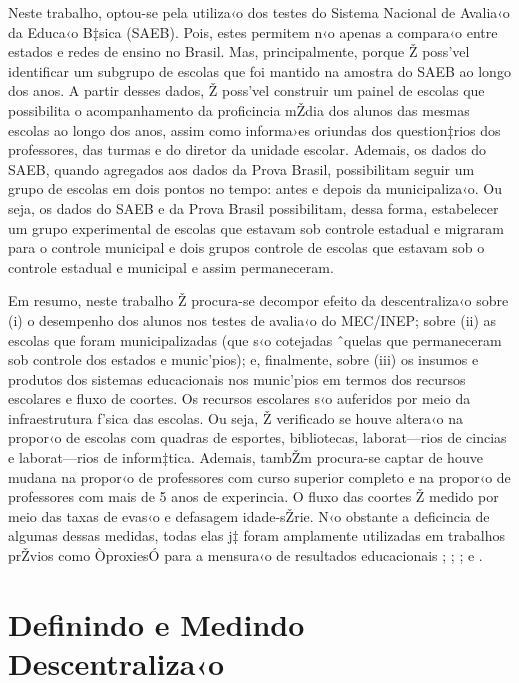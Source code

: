 \documentclass[a4paper, 12pt]{article}
\begin{document}
Neste trabalho, optou-se pela utiliza‹o dos testes do Sistema Nacional de Avalia‹o da Educa‹o B‡sica (SAEB). Pois, estes permitem n‹o apenas a compara‹o entre estados e redes de ensino no Brasil. Mas, principalmente, porque Ž poss’vel identificar um subgrupo de escolas que foi mantido na amostra do SAEB ao longo dos anos. A partir desses dados, Ž poss’vel construir um painel de escolas que possibilita o acompanhamento da proficincia mŽdia dos alunos das mesmas escolas ao longo dos anos, assim como informa›es oriundas dos question‡rios dos professores, das turmas e do diretor da unidade escolar. Ademais, os dados do SAEB, quando agregados aos dados da Prova Brasil, possibilitam seguir um grupo de escolas em dois pontos no tempo: antes e depois da municipaliza‹o. Ou seja, os dados do SAEB e da Prova Brasil possibilitam, dessa forma, estabelecer um grupo experimental de escolas que estavam sob controle estadual e migraram para o controle municipal e dois grupos controle de escolas que estavam sob o controle estadual e municipal e assim permaneceram.

Em resumo, neste trabalho Ž procura-se decompor efeito da descentraliza‹o sobre (i) o desempenho dos alunos nos testes de avalia‹o do MEC/INEP; sobre (ii) as escolas que foram municipalizadas (que s‹o cotejadas ˆquelas que permaneceram sob controle dos estados e munic’pios); e, finalmente, sobre (iii) os insumos e produtos dos sistemas educacionais nos munic’pios em termos dos recursos escolares e fluxo de coortes. Os recursos escolares s‹o auferidos por meio da infraestrutura f’sica das escolas. Ou seja, Ž verificado se houve altera‹o na propor‹o de escolas com quadras de esportes, bibliotecas, laborat—rios de cincias e laborat—rios de inform‡tica. Ademais, tambŽm procura-se captar de houve mudana na propor‹o de professores com curso superior completo e na propor‹o de professores com mais de 5 anos de experincia. O fluxo das coortes Ž medido por meio das taxas de evas‹o e defasagem idade-sŽrie. N‹o obstante a deficincia de algumas dessas medidas, todas elas j‡ foram amplamente utilizadas em trabalhos prŽvios como ÒproxiesÓ para a mensura‹o de resultados educacionais \cite{barro_international_2001}; \cite{amaral_decentralized_1995};  \cite{mahal_decentralization_2000}; \cite{prawda_educational_1993} e \cite{faguet_decentralizations_2008}.


\pagebreak
\section{Definindo e Medindo Descentraliza‹o}
\end{document}
